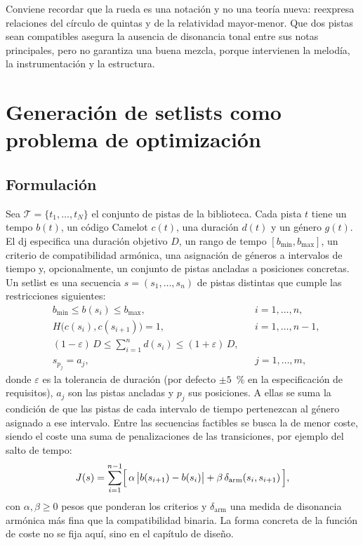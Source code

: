 Conviene recordar que la rueda es una notación y no una teoría nueva: reexpresa relaciones del círculo de quintas y de la relatividad mayor-menor. Que dos pistas sean compatibles asegura la ausencia de disonancia tonal entre sus notas principales, pero no garantiza una buena mezcla, porque intervienen la melodía, la instrumentación y la estructura.

\section{Generación de setlists como problema de optimización}
\label{sec:fund-optimizacion}

\subsection{Formulación}

Sea $\mathcal{T} = \{t_1, \dots, t_N\}$ el conjunto de pistas de la biblioteca. Cada pista $t$ tiene un tempo $b(t)$, un código Camelot $c(t)$, una duración $d(t)$ y un género $g(t)$. El \acs{dj} especifica una duración objetivo $D$, un rango de tempo $[b_{\min}, b_{\max}]$, un criterio de compatibilidad armónica, una asignación de géneros a intervalos de tiempo y, opcionalmente, un conjunto de pistas ancladas a posiciones concretas. Un setlist es una secuencia $s = (s_1, \dots, s_n)$ de pistas distintas que cumple las restricciones siguientes:
\begin{align}
  & b_{\min} \le b(s_i) \le b_{\max}, && i = 1,\dots,n, \label{eq:r-bpm}\\
  & H\bigl(c(s_i), c(s_{i+1})\bigr) = 1, && i = 1,\dots,n-1, \label{eq:r-har}\\
  & (1-\varepsilon)\, D \le \textstyle\sum_{i=1}^{n} d(s_i) \le (1+\varepsilon)\, D, \label{eq:r-dur}\\
  & s_{p_j} = a_j, && j = 1,\dots,m, \label{eq:r-anc}
\end{align}
donde $\varepsilon$ es la tolerancia de duración (por defecto $\pm 5$~\% en la especificación de requisitos), $a_j$ son las pistas ancladas y $p_j$ sus posiciones. A ellas se suma la condición de que las pistas de cada intervalo de tiempo pertenezcan al género asignado a ese intervalo. Entre las secuencias factibles se busca la de menor coste, siendo el coste una suma de penalizaciones de las transiciones, por ejemplo del salto de tempo:
\begin{equation}
  J(s) = \sum_{i=1}^{n-1} \Bigl[\, \alpha\, \bigl|b(s_{i+1}) - b(s_i)\bigr| + \beta\, \delta_{\mathrm{arm}}(s_i,s_{i+1}) \,\Bigr],
  \label{eq:coste}
\end{equation}
con $\alpha, \beta \ge 0$ pesos que ponderan los criterios y $\delta_{\mathrm{arm}}$ una medida de disonancia armónica más fina que la compatibilidad binaria. La forma concreta de la función de coste no se fija aquí, sino en el capítulo de diseño.

